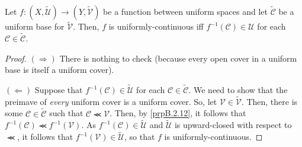 \begin{prp}\label{prpB.3.4}
Let $f:(X,\widetilde{\mathcal{U}})\rightarrow (Y,\widetilde{\mathcal{V}})$ be a function between uniform spaces and let $\widetilde{\mathcal{C}}$ be a uniform base for $\widetilde{\mathcal{V}}$.  Then, $f$ is uniformly-continuous iff $f^{-1}(\mathcal{C})\in \mathcal{U}$ for each $\mathcal{C}\in \widetilde{\mathcal{C}}$.
\begin{proof}
$(\Rightarrow )$ There is nothing to check (because every open cover in a uniform base is itself a uniform cover).

\blankline
\noindent
$(\Leftarrow )$ Suppose that $f^{-1}(\mathcal{C})\in \widetilde{\mathcal{U}}$ for each $\mathcal{C}\in \widetilde{\mathcal{C}}$.  We need to show that the preimave of \emph{every} uniform cover is a uniform cover.  So, let $\mathcal{V}\in \widetilde{\mathcal{V}}$.  Then, there is some $\mathcal{C}\in \widetilde{\mathcal{C}}$ such that $\mathcal{C}\llcurly \mathcal{V}$.  Then, by \cref{prpB.2.12}, it follows that $f^{-1}(\mathcal{C})\llcurly f^{-1}(\mathcal{V})$.  As $f^{-1}(\mathcal{C})\in \widetilde{\mathcal{U}}$ and $\widetilde{\mathcal{U}}$ is upward-closed with respect to $\llcurly$, it follows that $f^{-1}(\mathcal{V})\in \widetilde{\mathcal{U}}$, so that $f$ is uniformly-continuous.
\end{proof}
\end{prp}

